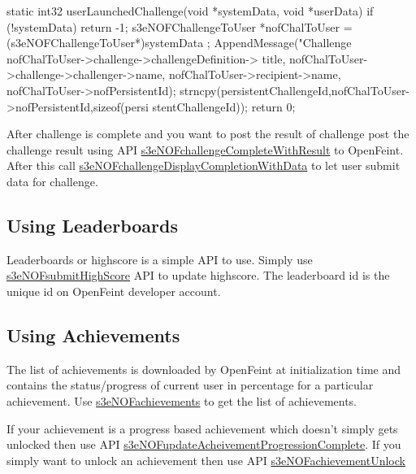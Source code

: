 \begin{DoxyCode}
 static int32 userLaunchedChallenge(void *systemData, void *userData)
 {
        if (!systemData) {
                return -1;
        }
        s3eNOFChallengeToUser *nofChalToUser = (s3eNOFChallengeToUser*)systemData
      ;
        AppendMessage("Challenge %
                                  nofChalToUser->challenge->challengeDefinition->
      title,
                                  nofChalToUser->challenge->challenger->name,
                                  nofChalToUser->recipient->name,
                                  nofChalToUser->nofPersistentId);
        strncpy(persistentChallengeId,nofChalToUser->nofPersistentId,sizeof(persi
      stentChallengeId));
        return 0;
 }
\end{DoxyCode}


After challenge is complete and you want to post the result of challenge post the challenge result using API \hyperlink{group___n_open_feint_api_group_gac0bbac15d2f5955c47e4b1c97de9041d}{s3eNOFchallengeCompleteWithResult} to OpenFeint. After this call \hyperlink{group___n_open_feint_api_group_ga5d1d6b1cc48e419f5b2c70008ebb7a27}{s3eNOFchallengeDisplayCompletionWithData} to let user submit data for challenge.\hypertarget{main_sec_4_6}{}\subsection{Using Leaderboards}\label{main_sec_4_6}
Leaderboards or highscore is a simple API to use. Simply use \hyperlink{group___n_open_feint_api_group_gab867b2aef6d359907508f9db15dc46b1}{s3eNOFsubmitHighScore} API to update highscore. The leaderboard id is the unique id on OpenFeint developer account.\hypertarget{main_sec_4_7}{}\subsection{Using Achievements}\label{main_sec_4_7}
The list of achievements is downloaded by OpenFeint at initialization time and contains the status/progress of current user in percentage for a particular achievement. Use \hyperlink{group___n_open_feint_api_group_ga00f8721dad47b69383090091a37ed97e}{s3eNOFachievements} to get the list of achievements.

If your achievement is a progress based achievement which doesn't simply gets unlocked then use API \hyperlink{group___n_open_feint_api_group_ga08d7542b314ea594515cffa2dd86374d}{s3eNOFupdateAcheivementProgressionComplete}. If you simply want to unlock an achievement then use API \hyperlink{group___n_open_feint_api_group_ga007858ccc16ba9fddaa18af73d68f399}{s3eNOFachievementUnlock}

